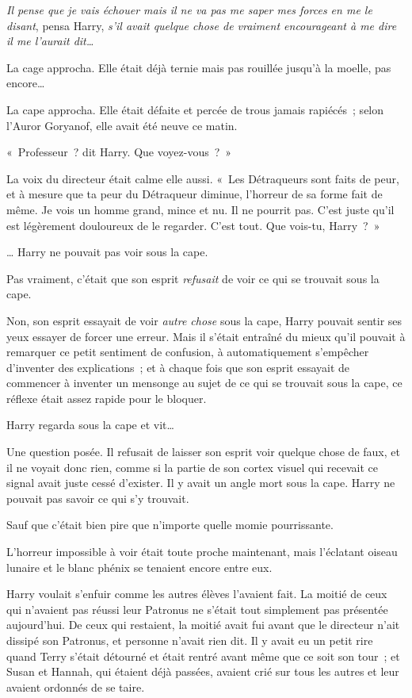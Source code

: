 \emph{Il pense que je vais échouer mais il ne va pas me saper mes forces en me le disant}, pensa Harry, \emph{s'il avait quelque chose de vraiment encourageant à me dire il me l'aurait dit…}

La cage approcha.
Elle était déjà ternie mais pas rouillée jusqu'à la moelle, pas encore…

La cape approcha.
Elle était défaite et percée de trous jamais rapiécés~; selon l'Auror Goryanof, elle avait été neuve ce matin.

«~Professeur~? dit Harry.
Que voyez-vous~?~»

La voix du directeur était calme elle aussi.
«~Les Détraqueurs sont faits de peur, et à mesure que ta peur du Détraqueur diminue, l'horreur de sa forme fait de même.
Je vois un homme grand, mince et nu.
Il ne pourrit pas.
C'est juste qu'il est légèrement douloureux de le regarder.
C'est tout.
Que vois-tu, Harry~?~»

… Harry ne pouvait pas voir sous la cape.

Pas vraiment, c'était que son esprit \emph{refusait} de voir ce qui se trouvait sous la cape.

Non, son esprit essayait de voir \emph{autre chose} sous la cape, Harry pouvait sentir ses yeux essayer de forcer une erreur.
Mais il s'était entraîné du mieux qu'il pouvait à remarquer ce petit sentiment de confusion, à automatiquement s'empêcher d'inventer des explications~; et à chaque fois que son esprit essayait de commencer à inventer un mensonge au sujet de ce qui se trouvait sous la cape, ce réflexe était assez rapide pour le bloquer.

Harry regarda sous la cape et vit…

Une question posée.
Il refusait de laisser son esprit voir quelque chose de faux, et il ne voyait donc rien, comme si la partie de son cortex visuel qui recevait ce signal avait juste cessé d'exister.
Il y avait un angle mort sous la cape.
Harry ne pouvait pas savoir ce qui s'y trouvait.

Sauf que c'était bien pire que n'importe quelle momie pourrissante.

L'horreur impossible à voir était toute proche maintenant, mais l'éclatant oiseau lunaire et le blanc phénix se tenaient encore entre eux.

Harry voulait s'enfuir comme les autres élèves l'avaient fait.
La moitié de ceux qui n'avaient pas réussi leur Patronus ne s'était tout simplement pas présentée aujourd'hui.
De ceux qui restaient, la moitié avait fui avant que le directeur n'ait dissipé son Patronus, et personne n'avait rien dit.
Il y avait eu un petit rire quand Terry s'était détourné et était rentré avant même que ce soit son tour~; et Susan et Hannah, qui étaient déjà passées, avaient crié sur tous les autres et leur avaient ordonnés de se taire.

